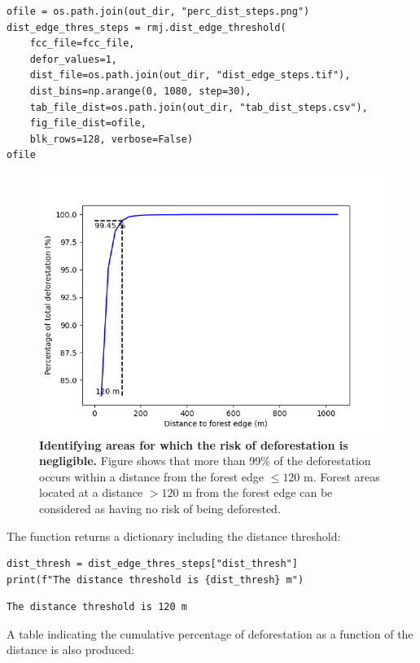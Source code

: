 \documentclass[paper=a4, 12pt, DIV=12]{scrartcl}
\begin{document}
\begin{verbatim}
ofile = os.path.join(out_dir, "perc_dist_steps.png")
dist_edge_thres_steps = rmj.dist_edge_threshold(
    fcc_file=fcc_file,
    defor_values=1,
    dist_file=os.path.join(out_dir, "dist_edge_steps.tif"),
    dist_bins=np.arange(0, 1080, step=30),
    tab_file_dist=os.path.join(out_dir, "tab_dist_steps.csv"),
    fig_file_dist=ofile,
    blk_rows=128, verbose=False)
ofile
\end{verbatim}

\begin{figure}[H]
\centering
\includegraphics[width=0.8\linewidth]{outputs/perc_dist_steps.png}
\caption{\label{fig:org69512a9}\textbf{Identifying areas for which the risk of deforestation is negligible.} Figure shows that more than 99\% of the deforestation occurs within a distance from the forest edge \(\leq 120\) m. Forest areas located at a distance \(> 120\) m from the forest edge can be considered as having no risk of being deforested.}
\end{figure}

The function returns a dictionary including the distance threshold:

\begin{verbatim}
dist_thresh = dist_edge_thres_steps["dist_thresh"]
print(f"The distance threshold is {dist_thresh} m")
\end{verbatim}

\begin{verbatim}
The distance threshold is 120 m
\end{verbatim}


A table indicating the cumulative percentage of deforestation as a function of the distance is also produced:
\end{document}
